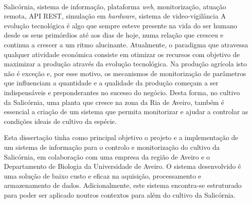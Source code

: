 \documentclass[11pt,twoside,a4paper]{report}
\begin{document}
\EndTitlePage
\titlepage\ \endtitlepage %

\TitlePage
	\vspace*{55mm}
	{Salicórnia, sistema de informação, plataforma \textit{web},  monitorização, atuação remota, API REST, simulação em \textit{hardware}, sistema de video-vigilância}
  	\vspace*{5mm}
       {A evolução tecnológica é algo que sempre esteve presente na vida do ser humano desde os seus primórdios até aos dias de hoje, numa relação que cresceu e continua a crescer a um ritmo alucinante.  Atualmente, o paradigma que atravessa qualquer atividade económica consiste em otimizar os recursos com objetivo de maximizar a produção através da evolução tecnológica. Na produção agrícola isto não é exceção e, por esse motivo, os mecanismos de monitorização de parâmetros que influenciam a quantidade e a qualidade da produção começam a ser indispensáveis e preponderantes no sucesso do negócio. Desta forma, no cultivo da Salicórnia, uma planta que cresce na zona da Ria de Aveiro, também é essencial a criação de um sistema que permita monitorizar e ajudar a controlar as condições ideais de cultivo da espécie. }
              
  \TEXT{}
       {Esta dissertação tinha como principal objetivo o projeto e a implementação de um sistema de informação para o controlo e monitorização do cultivo da Salicórnia, em colaboração com uma empresa da região de Aveiro e o Departamento de Biologia da Universidade de Aveiro. O sistema desenvolvido é uma solução de baixo custo e eficaz na aquisição, processamento e armazenamento de dados. Adicionalmente, este sistema encontra-se estruturado para poder ser aplicado noutros contextos para além do cultivo da Salicórnia.   }
       
       

       
\end{document}
